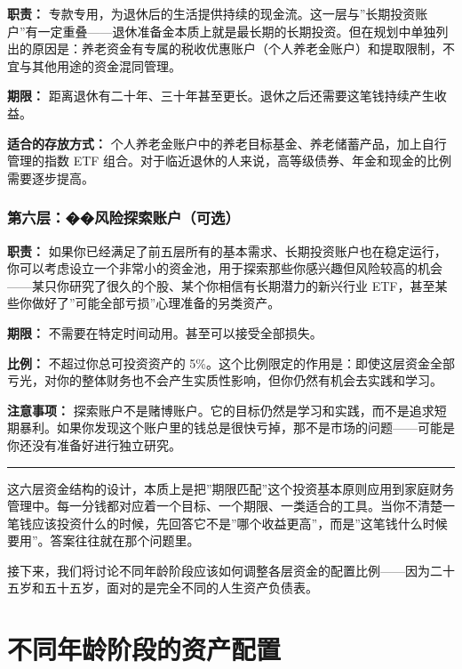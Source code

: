 \documentclass[a4paper,11pt,oneside,fontset=none,UTF8,zihao=-4]{ctexbook}
\begin{document}
\textbf{职责：}
专款专用，为退休后的生活提供持续的现金流。这一层与''长期投资账户''有一定重叠------退休准备金本质上就是最长期的长期投资。但在规划中单独列出的原因是：养老资金有专属的税收优惠账户（个人养老金账户）和提取限制，不宜与其他用途的资金混同管理。

\textbf{期限：}
距离退休有二十年、三十年甚至更长。退休之后还需要这笔钱持续产生收益。

\textbf{适合的存放方式：}
个人养老金账户中的养老目标基金、养老储蓄产品，加上自行管理的指数 ETF
组合。对于临近退休的人来说，高等级债券、年金和现金的比例需要逐步提高。

\subsection{第六层：��风险探索账户（可选）}\label{ux7b2cux516dux5c42ux98ceux9669ux63a2ux7d22ux8d26ux6237ux53efux9009}

\textbf{职责：}
如果你已经满足了前五层所有的基本需求、长期投资账户也在稳定运行，你可以考虑设立一个非常小的资金池，用于探索那些你感兴趣但风险较高的机会------某只你研究了很久的个股、某个你相信有长期潜力的新兴行业
ETF，甚至某些你做好了''可能全部亏损''心理准备的另类资产。

\textbf{期限：} 不需要在特定时间动用。甚至可以接受全部损失。

\textbf{比例：} 不超过你总可投资资产的
5\%。这个比例限定的作用是：即使这层资金全部亏光，对你的整体财务也不会产生实质性影响，但你仍然有机会去实践和学习。

\textbf{注意事项：}
探索账户不是赌博账户。它的目标仍然是学习和实践，而不是追求短期暴利。如果你发现这个账户里的钱总是很快亏掉，那不是市场的问题------可能是你还没有准备好进行独立研究。

\begin{center}{\color{dh-bronze}\rule{0.2\textwidth}{0.5pt}}\end{center}

这六层资金结构的设计，本质上是把''期限匹配''这个投资基本原则应用到家庭财务管理中。每一分钱都对应着一个目标、一个期限、一类适合的工具。当你不清楚一笔钱应该投资什么的时候，先回答它不是''哪个收益更高''，而是''这笔钱什么时候要用''。答案往往就在那个问题里。

接下来，我们将讨论不同年龄阶段应该如何调整各层资金的配置比例------因为二十五岁和五十五岁，面对的是完全不同的人生资产负债表。

\newpage

\chapter{不同年龄阶段的资产配置}\label{ux4e0dux540cux5e74ux9f84ux9636ux6bb5ux7684ux8d44ux4ea7ux914dux7f6e}
\end{document}
